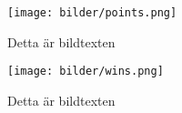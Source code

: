 \begin{figure}[htb]
	\begin{center}
	\texttt{[image: bilder/points.png]}
	\caption{Detta är bildtexten}
	\label{points}
	\end{center}
\end{figure}

\begin{figure}[htb]
	\begin{center}
	\texttt{[image: bilder/wins.png]}
	\caption{Detta är bildtexten}
	\label{wins}
	\end{center}
\end{figure}


